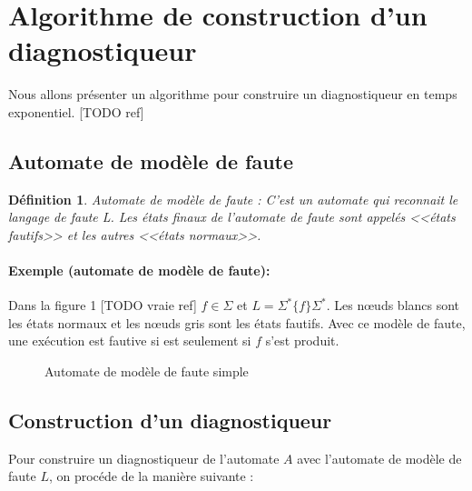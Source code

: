 \documentclass[10pt,a4paper]{article}
\newtheorem {mydef} {D\'efinition}
\begin{document}

\section{Algorithme de construction d'un diagnostiqueur}
    Nous allons présenter un algorithme pour construire un diagnostiqueur en temps exponentiel. [TODO ref]
        \subsection{Automate de mod\`ele de faute}
   \begin{mydef}{Automate de mod\`ele de faute : }
C'est un automate qui reconnait le langage de faute L. Les états finaux de l'automate de faute sont appelés <<\'etats fautifs>> et les autres <<\'etats normaux>>.
 \end{mydef}
    
    \paragraph{Exemple (automate de mod\`ele de faute): } %
    
   Dans la figure 1 [TODO vraie ref] $f\in \Sigma$ et $L  = \Sigma^*\{f\}\Sigma^*$. Les  nœuds blancs sont les états normaux et les nœuds gris sont les \'etats fautifs. Avec ce mod\`ele de faute, une ex\'ecution est fautive si est seulement si $f$ s'est produit.
        \begin{figure}[H]
                \centering
                \caption{Automate de mod\`ele de faute simple}
        \end{figure}
        
    
    \subsection{Construction d'un diagnostiqueur}
    Pour construire un diagnostiqueur de l'automate $A$ avec l'automate de mod\`ele de faute $L$, on proc\'ede de la mani\`ere suivante :
    
\end{document}
